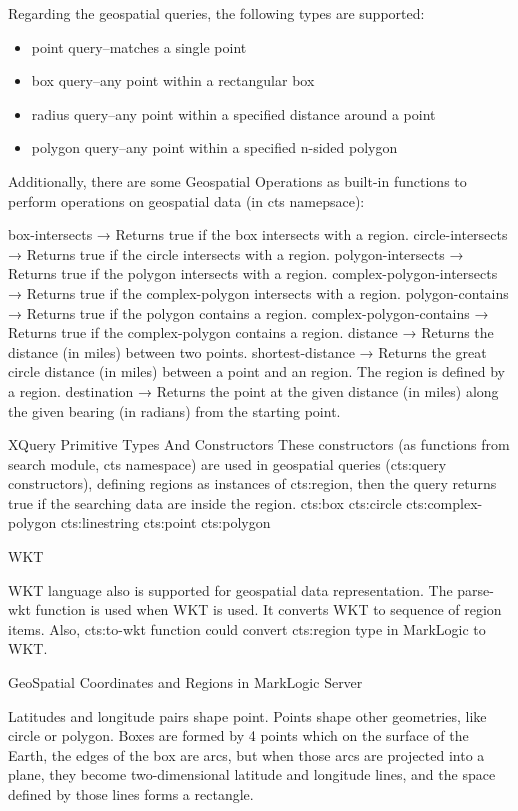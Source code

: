 \documentclass[a4paper,12pt]{article}
\begin{document}
Regarding the geospatial queries, the following types are supported:
\begin{itemize}
\item point query--matches a single point
\item box query--any point within a rectangular box
\item radius query--any point within a specified distance around a point
\item polygon query--any point within a specified n-sided polygon
\end{itemize}

Additionally, there are some Geospatial Operations as built-in functions to perform operations on geospatial data (in cts namepsace):

 box-intersects → Returns true if the box intersects with a region.
 circle-intersects → Returns true if the circle intersects with a region.
 polygon-intersects → Returns true if the polygon intersects with a region.
 complex-polygon-intersects → Returns true if the complex-polygon intersects with a region.
 polygon-contains → Returns true if the polygon contains a region.
 complex-polygon-contains → Returns true if the complex-polygon contains a region.
 distance → Returns the distance (in miles) between two points.
 shortest-distance → Returns the great circle distance (in miles) between a point and an region. The region is defined by a region.
 destination → Returns the point at the given distance (in miles) along the given bearing (in radians) from the starting point.


 XQuery Primitive Types And Constructors
These constructors (as functions from search module, cts namespace) are used in geospatial queries (cts:query constructors), defining regions as instances of cts:region, then the query returns true if the searching data are inside the region.
 cts:box 
 cts:circle
 cts:complex-polygon
 cts:linestring
 cts:point
 cts:polygon

 WKT

	WKT language also is supported for geospatial data representation. The parse-wkt function is used when WKT is used. It converts WKT to sequence of region items. Also, cts:to-wkt function could convert cts:region type in MarkLogic to WKT.

GeoSpatial Coordinates and Regions in MarkLogic Server


Latitudes and longitude pairs shape point. Points shape other geometries, like circle or polygon. Boxes are formed by 4 points which on the surface of the Earth, the edges of the box are arcs, but when those arcs are projected into a plane, they become two-dimensional latitude and longitude lines, and the space defined by those lines forms a rectangle.
\end{document}
